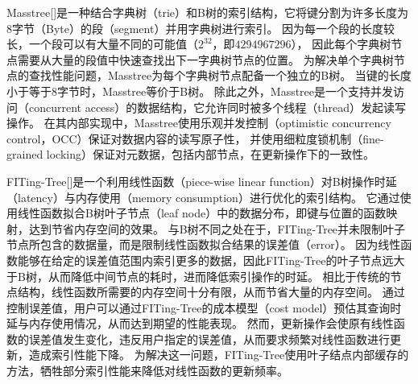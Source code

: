 Masstree[]是一种结合字典树（trie）和B树的索引结构，它将键分割为许多长度为8字节（Byte）的段（segment）并用字典树进行索引。
因为每一个段的长度较长，一个段可以有大量不同的可能值（$2^32$，即$4294967296$），
因此每个字典树节点需要从大量的段值中快速查找出下一字典树节点的位置。
为解决单个字典树节点的查找性能问题，Masstree为每个字典树节点配备一个独立的B树。
当键的长度小于等于8字节时，Masstree等价于B树。
除此之外，Masstree是一个支持并发访问（concurrent access）的数据结构，它允许同时被多个线程（thread）发起读写操作。
在其内部实现中，Masstree使用乐观并发控制（optimistic concurrency control，OCC）保证对数据内容的读写原子性，
并使用细粒度锁机制（fine-grained locking）保证对元数据，包括内部节点，在更新操作下的一致性。


FITing-Tree[]是一个利用线性函数（piece-wise linear function）对B树操作时延（latency）与内存使用（memory consumption）进行优化的索引结构。
它通过使用线性函数拟合B树叶子节点（leaf node）中的数据分布，即键与位置的函数映射，达到节省内存空间的效果。
与B树不同之处在于，FITing-Tree并未限制叶子节点所包含的数据量，而是限制线性函数拟合结果的误差值（error）。
因为线性函数能够在给定的误差值范围内索引更多的数据，因此FITing-Tree的叶子节点远大于B树，从而降低中间节点的耗时，进而降低索引操作的时延。
相比于传统的节点结构，线性函数所需要的内存空间十分有限，从而节省大量的内存空间。
通过控制误差值，用户可以通过FITing-Tree的成本模型（cost model）预估其查询时延与内存使用情况，从而达到期望的性能表现。
然而，更新操作会使原有线性函数的误差值发生变化，违反用户指定的误差值，从而要求频繁对线性函数进行更新，造成索引性能下降。
为解决这一问题，FITing-Tree使用叶子结点内部缓存的方法，牺牲部分索引性能来降低对线性函数的更新频率。


